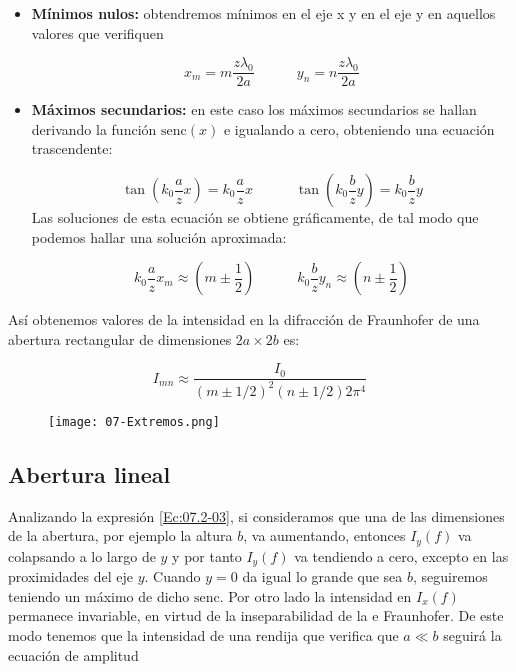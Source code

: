 \documentclass[12pt,a4paper]{book}
\numberwithin{equation}{section}
\numberwithin{figure}{section}
\newcommand{\tquad}{\quad \quad \quad}
\newcommand{\parentesis}[1]{\left( #1  \right)}
\newcommand{\1}{_{(1)}}
\newcommand{\2}{_{(2)}}
\newcommand{\sinc}{\mathrm{senc} }
\theoremstyle{definition}
\begin{document}
\begin{itemize}
    \item \textbf{Mínimos nulos:} obtendremos mínimos en el eje x y en el eje y en aquellos valores que verifiquen

    \begin{equation}
        x_m = m \frac{z\lambda_0}{2a} \tquad y_n = n \frac{z \lambda_0}{2a}
    \end{equation}

    \item  \textbf{Máximos secundarios:} en este caso los máximos secundarios se hallan derivando la función $\sinc(x)$ e igualando a cero, obteniendo una ecuación trascendente:

    \begin{equation}
        \tan \parentesis{k_0 \frac{a}{z}x} = k_0 \frac{a}{z}x \tquad  
        \tan \parentesis{k_0 \frac{b}{z}y} = k_0 \frac{b}{z}y
    \end{equation}
    Las soluciones de esta ecuación se obtiene gráficamente, de tal modo que podemos hallar una solución aproximada:

    \begin{equation}
        k_0 \frac{a}{z} x_m \approx \parentesis{m\pm \frac{1}{2}} \tquad 
        k_0 \frac{b}{z} y_n \approx \parentesis{n \pm \frac{1}{2}}
    \end{equation}
\end{itemize}

Así obtenemos valores de la intensidad en la difracción de Fraunhofer de una abertura rectangular de dimensiones $2a \times 2b$ es:

\begin{equation}
    I_{mn} \approx \frac{I_0}{(m\pm1/2)^2(n\pm1/2)2 \pi^4}
\end{equation}

\begin{figure}[h!]
    \centering
    \texttt{[image: 07-Extremos.png]}
    \caption{}
    \label{Fig:07.2-01}
\end{figure}


\subsection{Abertura lineal}

Analizando la expresión \ref{Ec:07.2-03}, si consideramos que una de las dimensiones de la abertura, por ejemplo la altura $b$, va aumentando, entonces $I_y(f)$ va colapsando a lo largo de $y$ y por tanto $I_y(f)$ va tendiendo a cero, excepto en las proximidades del eje $y$. Cuando $y=0$ da igual lo grande que sea $b$, seguiremos teniendo un máximo de dicho $\sinc$. Por otro lado la intensidad en $I_x(f)$ permanece invariable, en virtud de la inseparabilidad de la  e Fraunhofer. De este modo tenemos que la intensidad de una rendija que verifica que $a\ll b$ seguirá la ecuación de amplitud
\end{document}
